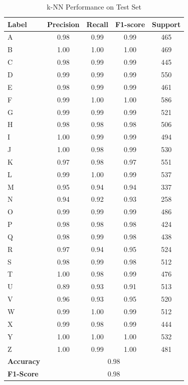 \begin{table}[H]
\centering
\small
\renewcommand{\arraystretch}{1.2}
\setlength{\tabcolsep}{10pt}
\caption{k-NN Performance on Test Set}
\begin{tabular}{|p{2cm}|cccc|}
\hline
\textbf{Label}& \textbf{Precision} & \textbf{Recall} & \textbf{F1-score} & \textbf{Support} \\
\hline
A & 0.98 & 0.99 & 0.99 & 465 \\
B & 1.00 & 1.00 & 1.00 & 469 \\
C & 0.98 & 0.99 & 0.99 & 445 \\
D & 0.99 & 0.99 & 0.99 & 550 \\
E & 0.98 & 0.99 & 0.99 & 461 \\
F & 0.99 & 1.00 & 1.00 & 586 \\
G & 0.99 & 0.99 & 0.99 & 521 \\
H & 0.98 & 0.98 & 0.98 & 506 \\
I & 1.00 & 0.99 & 0.99 & 494 \\
J & 1.00 & 0.98 & 0.99 & 530 \\
K & 0.97 & 0.98 & 0.97 & 551 \\
L & 0.99 & 1.00 & 0.99 & 537 \\
M & 0.95 & 0.94 & 0.94 & 337 \\
N & 0.94 & 0.92 & 0.93 & 258 \\
O & 0.99 & 0.99 & 0.99 & 486 \\
P & 0.98 & 0.98 & 0.98 & 424 \\
Q & 0.98 & 0.99 & 0.98 & 438 \\
R & 0.97 & 0.94 & 0.95 & 524 \\
S & 0.98 & 0.99 & 0.98 & 512 \\
T & 1.00 & 0.98 & 0.99 & 476 \\
U & 0.89 & 0.93 & 0.91 & 513 \\
V & 0.96 & 0.93 & 0.95 & 520 \\
W & 0.99 & 1.00 & 0.99 & 512 \\
X & 0.99 & 0.98 & 0.99 & 444 \\
Y & 1.00 & 1.00 & 1.00 & 532 \\
Z & 1.00 & 0.99 & 1.00 & 481 \\
\hline
\textbf{Accuracy} & \multicolumn{4}{|c|}{0.98} \\
\textbf{F1-Score} & \multicolumn{4}{|c|}{0.98}  \\
\hline
\end{tabular}
\end{table}


